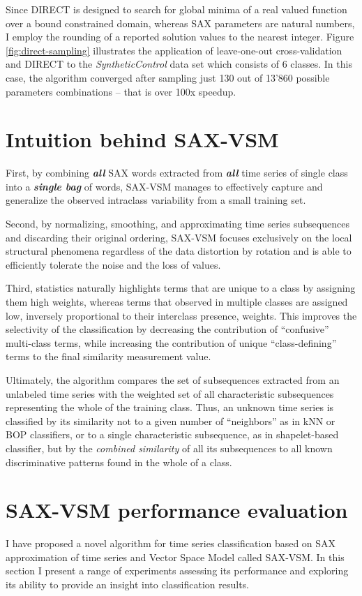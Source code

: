 Since DIRECT is designed to search for global minima of a real valued function over a bound constrained domain, 
whereas SAX parameters are natural numbers, I employ the rounding of a reported solution values to the nearest integer.
Figure \ref{fig:direct-sampling} illustrates the application of leave-one-out cross-validation and DIRECT to the
\textit{SyntheticControl} data set \cite{ucr} which consists of 6 classes. 
In this case, the algorithm converged after sampling just 130 out of 13'860 possible parameters combinations -- 
that is over 100x speedup.

\section{Intuition behind SAX-VSM}
First, by combining \textit{\textbf{all}} SAX words extracted from 
\textit{\textbf{all}} time series of single class into a \textit{\textbf{single bag}} of 
words, SAX-VSM manages to effectively capture and generalize the observed intraclass variability 
from a small training set.  

Second, by normalizing, smoothing, and approximating time series subsequences and discarding their 
original ordering, SAX-VSM focuses exclusively on the local structural phenomena regardless of the 
data distortion by rotation and is able to efficiently tolerate the noise and the loss of values.

Third,  \tfidf statistics naturally highlights terms that are unique to a class by assigning them high weights, 
whereas terms that observed in multiple classes are assigned low, 
inversely proportional to their interclass presence, weights. 
This improves the selectivity of the classification by decreasing the contribution of ``confusive'' multi-class terms, 
while increasing the contribution of unique ``class-defining'' terms to the final similarity measurement value.

Ultimately, the algorithm compares the set of subsequences extracted from an unlabeled time series 
with the weighted set of all characteristic subsequences representing the whole of the training class. 
Thus, an unknown time series is classified by its similarity not to a given number of 
``neighbors'' as in kNN or BOP classifiers, or to a single characteristic subsequence, as in shapelet-based classifier, 
but by the \textit{combined similarity} of all its subsequences to all known discriminative patterns found in the 
whole of a class.

\section{SAX-VSM performance evaluation} \label{results}
I have proposed a novel algorithm for time series classification based on SAX approximation of time series and 
Vector Space Model called SAX-VSM. In this section I present a range of experiments assessing its performance 
and exploring its ability to provide an insight into classification results.

